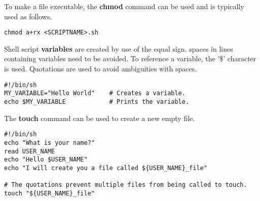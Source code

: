 To make a file executable, the \textbf{chmod} command can be used and is typically used as follows.
\begin{lstlisting}
chmod a+rx <SCRIPTNAME>.sh
\end{lstlisting}

Shell script \textbf{variables} are created by use of the equal sign. spaces in lines containing variables need to be avoided. To reference a variable, the '\$' character is used. Quotations are used to avoid ambiguities with spaces.
\begin{lstlisting}
#!/bin/sh
MY_VARIABLE="Hello World"    # Creates a variable.
echo $MY_VARIABLE            # Prints the variable.
\end{lstlisting}




The \textbf{touch} command can be used to create a new empty file.
\begin{lstlisting}
#!/bin/sh
echo "What is your name?"
read USER_NAME
echo "Hello $USER_NAME"
echo "I will create you a file called ${USER_NAME}_file"

# The quotations prevent multiple files from being called to touch.
touch "${USER_NAME}_file"
\end{lstlisting}